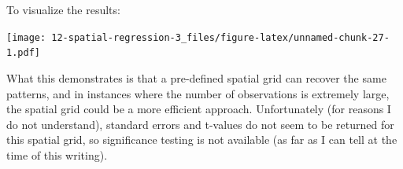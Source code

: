 \documentclass[
]{book}
\newenvironment{Shaded}{\begin{snugshade}}{\end{snugshade}}
\newcommand{\AttributeTok}[1]{\textcolor[rgb]{0.77,0.63,0.00}{#1}}
\newcommand{\CommentTok}[1]{\textcolor[rgb]{0.56,0.35,0.01}{\textit{#1}}}
\newcommand{\FunctionTok}[1]{\textcolor[rgb]{0.00,0.00,0.00}{#1}}
\newcommand{\NormalTok}[1]{#1}
\newcommand{\OtherTok}[1]{\textcolor[rgb]{0.56,0.35,0.01}{#1}}
\newcommand{\SpecialCharTok}[1]{\textcolor[rgb]{0.00,0.00,0.00}{#1}}
\newcommand{\StringTok}[1]{\textcolor[rgb]{0.31,0.60,0.02}{#1}}
\begin{document}
\begin{Shaded}
\end{Shaded}

To visualize the results:

\begin{Shaded}
\end{Shaded}

\texttt{[image: 12-spatial-regression-3\_files/figure-latex/unnamed-chunk-27-1.pdf]}

What this demonstrates is that a pre-defined spatial grid can recover the same patterns, and in instances where the number of observations is extremely large, the spatial grid could be a more efficient approach. Unfortunately (for reasons I do not understand), standard errors and t-values do not seem to be returned for this spatial grid, so significance testing is not available (as far as I can tell at the time of this writing).
\end{document}
